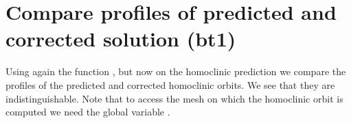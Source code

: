 \documentclass[letterpaper,10pt,english]{jupyterBook}
\begin{document}
\begin{sphinxVerbatim}[commandchars=\\\{\}]
\PYG{p}{[}\PYG{p}{]}
\PYG{p}{[}\PYG{p}{]}
\end{sphinxVerbatim}


\section{Compare profiles of predicted and corrected solution (bt1)}
\label{\detokenize{HomoclinicRGflows:compare-profiles-of-predicted-and-corrected-solution-bt1}}
\sphinxAtStartPar
Using again the  function , but now on the homoclinic
prediction  we compare the profiles of the predicted and corrected
homoclinic orbits. We see that they are indistinguishable. Note that to access
the mesh on which the homoclinic orbit is computed we need the global variable
.
\end{document}
